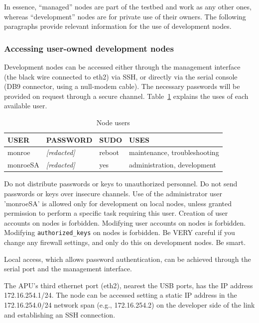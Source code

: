 \documentclass[a4paper,10pt]{article}
\newcommand{\identifier}[1]{{\texttt{\small{#1}}}}
\begin{document}
In essence, ``managed'' nodes are part of the testbed and work as any other ones, whereas ``development'' nodes are for private use of their owners.
The following paragraphs provide relevant information for the use of development nodes.

\subsubsection{Accessing user-owned development nodes}
Development nodes can be accessed either through the management interface (the black wire connected to eth2) via SSH, or directly via the serial console (DB9 connector, using a null-modem cable).
The necessary passwords will be provided on request through a secure channel.
Table~\ref{tab:developmentNodeUsers} explains the uses of each available user.

\begin{table}[tp]
	\caption{Node users}\label{tab:developmentNodeUsers}
	\begin{center}
		\begin{tabular}{llll}
			\toprule
			\textbf{USER} & \textbf{PASSWORD} & \textbf{SUDO} & \textbf{USES} \\ \midrule
			monroe & \emph{[redacted]} & reboot & maintenance, troubleshooting \\
			monroeSA & \emph{[redacted]} & yes & administration, development \\
			\bottomrule
		\end{tabular}
	\end{center}
\end {table}

Do not distribute passwords or keys to unauthorized personnel.
Do not send passwords or keys over insecure channels.
Use of the administrator user 'monroeSA' is allowed only for development on local nodes, unless granted permission to perform a specific task requiring this user.
Creation of user accounts on nodes is forbidden.
Modifying user accounts on nodes is forbidden.
Modifying \identifier{authorized\_keys} on nodes is forbidden.
Be VERY careful if you change any firewall settings, and only do this on development nodes.
Be smart.

Local access, which allows password authentication, can be achieved through the serial port and the management interface.

The APU's third ethernet port (eth2), nearest the USB ports, has the IP address 172.16.254.1/24.
The node can be accessed setting a static IP address in the 172.16.254.0/24 network span (e.g., 172.16.254.2) on the developer side of the link and establishing an SSH connection.
\end{document}
